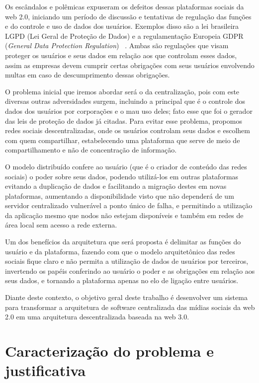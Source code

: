 Os escândalos e polêmicas expuseram os defeitos dessas plataformas sociais da web 2.0, iniciando um período de discussão e tentativas de regulação das funções e do controle e uso de dados dos usuários.
Exemplos disso são a lei brasileira LGPD (Lei Geral de Proteção de Dados) e a regulamentação Europeia GDPR (\textit{General Data Protection Regulation})~\cite{LGPD1} \cite{GPDR1}.
Ambas são regulações que visam proteger os usuários e seus dados em relação aos que controlam esses dados, assim as empresas devem cumprir certas obrigações com seus usuários envolvendo multas em caso de descumprimento dessas obrigações.

O problema inicial que iremos abordar será o da centralização, pois com este diversas outras adversidades surgem, incluindo a principal que é o controle dos dados dos usuários por corporações e o mau uso deles; fato esse que foi o gerador das leis de proteção de dados já citadas.
Para evitar esse problema, propomos redes sociais descentralizadas, onde os usuários controlam seus dados e escolhem com quem compartilhar, estabelecendo uma plataforma que serve de meio de compartilhamento e não de concentração de informação.

O modelo distribuído confere ao usuário (que é o criador de conteúdo das redes sociais) o poder sobre seus dados, podendo utilizá-los em outras plataformas evitando a duplicação de dados e facilitando a migração destes em novas plataformas, aumentando a disponibilidade visto que não dependerá de um servidor centralizado vulnerável a  ponto único de falha, e permitindo a utilização da aplicação mesmo que nodos não estejam disponíveis e também em redes de área local sem acesso a rede externa.

Um dos benefícios da arquitetura que será proposta é delimitar as funções do usuário e da plataforma, fazendo com que o modelo arquitetônico das redes sociais fique claro e não permita a utilização de dados de usuários por terceiros, invertendo os papéis conferindo ao usuário o poder e as obrigações em relação aos seus dados, e tornando a plataforma apenas no elo de ligação entre usuários.

Diante deste contexto, o objetivo geral deste trabalho é desenvolver um sistema para transformar a arquitetura de software centralizada das mídias sociais da web 2.0 em uma arquitetura descentralizada baseada na web 3.0.

\chapter{Caracterização do problema e justificativa}

